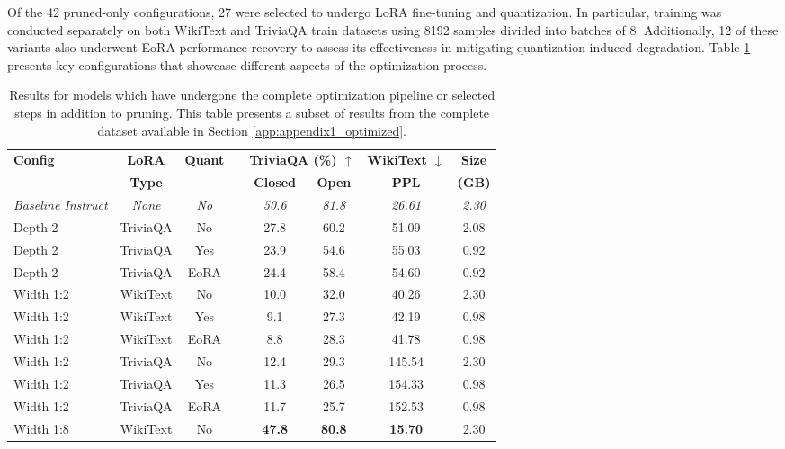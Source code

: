 Of the 42 pruned-only configurations, 27 were selected to undergo LoRA fine-tuning and quantization. In particular, training was conducted separately on both WikiText and TriviaQA train datasets using 8192 samples divided into batches of 8. Additionally, 12 of these variants also underwent EoRA performance recovery to assess its effectiveness in mitigating quantization-induced degradation. Table \ref{tab:complete_pipeline_results} presents key configurations that showcase different aspects of the optimization process.

{\scriptsize
\begin{table}[htbp]
\centering
\scriptsize
\caption[Results for Complete Pipeline Configurations (Subset)]{Results for models which have undergone the complete optimization pipeline or selected steps in addition to pruning. This table presents a subset of results from the complete dataset available in Section \ref{app:appendix1_optimized}.} \label{tab:complete_pipeline_results}
\begin{tabular}{lcclcccc}
\hline
\textbf{Config} & \textbf{LoRA} & \textbf{Quant} & & \multicolumn{2}{c}{\textbf{TriviaQA (\%) $\uparrow$}} & \textbf{WikiText $\downarrow$} & \textbf{Size} \\
\cline{5-6}
& \textbf{Type} & & & \textbf{Closed} & \textbf{Open} & \textbf{PPL} & \textbf{(GB)} \\
\hline
\textit{Baseline Instruct} & \textit{None} & \textit{No} & & \textit{50.6} & \textit{81.8} & \textit{26.61} & \textit{2.30} \\
Depth 2 & TriviaQA & No & & 27.8 & 60.2 & 51.09 & 2.08 \\
Depth 2 & TriviaQA & Yes & & 23.9 & 54.6 & 55.03 & 0.92 \\
Depth 2 & TriviaQA & EoRA & & 24.4 & 58.4 & 54.60 & 0.92 \\
Width 1:2 & WikiText & No & & 10.0 & 32.0 & 40.26 & 2.30 \\
Width 1:2 & WikiText & Yes & & 9.1 & 27.3 & 42.19 & 0.98 \\
Width 1:2 & WikiText & EoRA & & 8.8 & 28.3 & 41.78 & 0.98 \\
Width 1:2 & TriviaQA & No & & 12.4 & 29.3 & 145.54 & 2.30 \\
Width 1:2 & TriviaQA & Yes & & 11.3 & 26.5 & 154.33 & 0.98 \\
Width 1:2 & TriviaQA & EoRA & & 11.7 & 25.7 & 152.53 & 0.98 \\
Width 1:8 & WikiText & No & & \textbf{47.8} & \textbf{80.8} & \textbf{15.70} & 2.30 \\

\end{tabular}
\end{table}}
